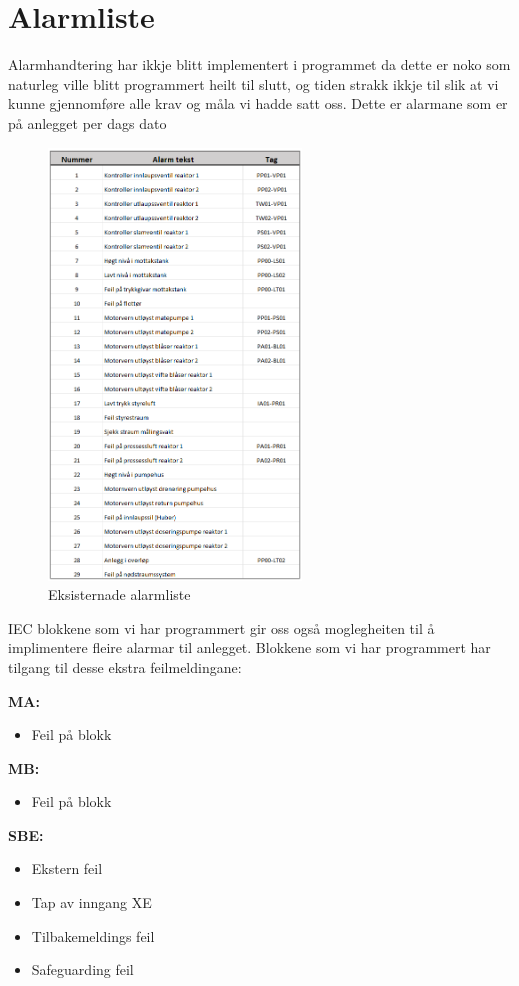 \newpage
\section{Alarmliste}
\thispagestyle{fancy}

Alarmhandtering har ikkje blitt implementert i programmet da dette er noko som naturleg ville blitt programmert heilt til slutt,
og tiden strakk ikkje til slik at vi kunne gjennomføre alle krav og måla vi hadde satt oss.
Dette er alarmane som er på anlegget per dags dato

\begin{figure}[htbp]
    \centering
    \includegraphics[width=0.6\textwidth]{Bilder/Gammal_Alarmliste.png}
    \caption{Eksisternade alarmliste}\label{fig:reaktorsoner}
\end{figure}

\newpage

IEC blokkene som vi har programmert gir oss også moglegheiten til å implimentere fleire alarmar til anlegget.
Blokkene som vi har programmert har tilgang til desse ekstra feilmeldingane:

\textbf{MA:}
    \begin{itemize}
        \item Feil på blokk
    \end{itemize}
\textbf{MB:}
    \begin{itemize}
        \item Feil på blokk
    \end{itemize}
\textbf{SBE:}
    \begin{itemize}
        \item Ekstern feil
        \item Tap av inngang XE
        \item Tilbakemeldings feil
        \item Safeguarding feil
    \end{itemize}

